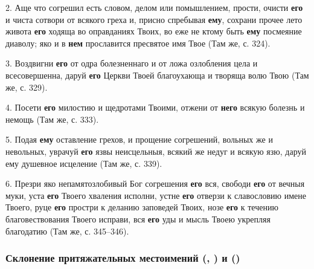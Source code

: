 \documentclass[11pt,a4paper,oneside]{memoir}
\begin{document}
    2. Аще что согрешил есть словом, делом или помышлением, прости, очисти \textbf{его} и чиста сотвори от всякого греха и, присно спребывая \textbf{ему}, сохрани прочее лето живота \textbf{его} ходяща во оправданиях Твоих, во еже не ктому быть \textbf{ему} посмеяние диаволу; яко и в \textbf{нем} прославится пресвятое имя Твое (Там же, с. 324).
    
    3. Воздвигни \textbf{его} от одра болезненнаго и от ложа озлобления цела и всесовершенна, даруй \textbf{его} Церкви Твоей благоухающа и творяща волю Твою (Там же, с. 329).
    
    4. Посети \textbf{его} милостию и щедротами Твоими, отжени от \textbf{него} всякую болезнь и немощь (Там же, с. 333).
    
    5. Подая \textbf{ему} оставление грехов, и прощение согрешений, вольных же и невольных, уврачуй \textbf{его} язвы неисцельныя, всякий же недуг и всякую язю, даруй ему душевное исцеление (Там же, с. 339).
    
    6. Презри яко непамятозлобивый Бог согрешения \textbf{его} вся, свободи \textbf{его} от вечныя муки, уста \textbf{его} Твоего хваления исполни, устне \textbf{его} отверзи к славословию имене Твоего, руце \textbf{его} простри к деланию заповедей Твоих, нозе \textbf{его} к течению благовествования Твоего исправи, вся \textbf{его} уды и мысль Твоею укрепляя благодатию (Там же, с. 345--346).

                \subsubsection[Склонение притяжательных местоимений]{Склонение притяжательных местоимений {} ({}, {}) и {} ({})}
    
\end{document}
